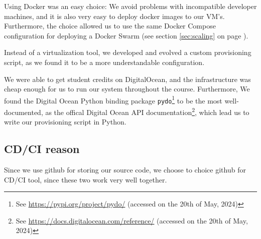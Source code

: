 Using Docker was an easy choice: We avoid problems with incompatible developer machines, and it is also very easy to deploy docker images to our VM's. Furthermore,
the choice allowed us to use the same Docker Compose configuration for deploying a Docker Swarm (see section \ref{sec:scaling} on page \pageref{sec:scaling}).

Instead of a virtualization tool, we developed and evolved a custom provisioning script, as we found it to be a more understandable configuration.%


We were able to get student credits on DigitalOcean, and the infrastructure was cheap enough for us to run our system throughout the course.
Furthermore, We found the Digital Ocean Python binding package \texttt{pydo}\footnote{See \url{https://pypi.org/project/pydo/} (accessed on the 20th of May, 2024)} to be the most well-documented, as the offical Digital Ocean API documentation\footnote{See \url{https://docs.digitalocean.com/reference/} (accessed on the 20th of May, 2024)}, which lead us to write our provisioning script in Python.


\subsection{CD/CI reason}
Since we use github for storing our source code, we choose to choice github for CD/CI tool, since these two work very well together.


